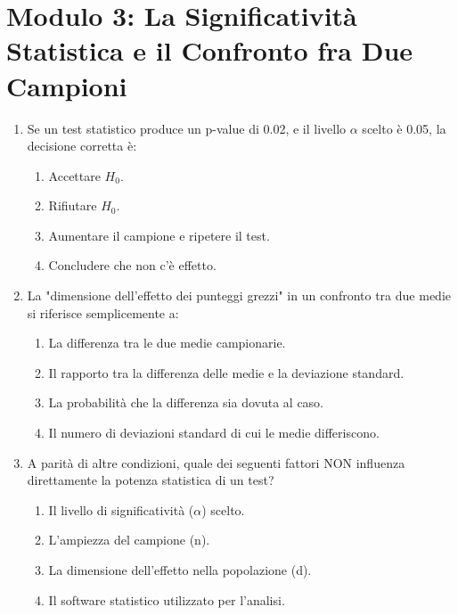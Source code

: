 \documentclass[12pt, a4paper]{article}
\begin{document}
\section*{Modulo 3: La Significatività Statistica e il Confronto fra Due Campioni}
\begin{enumerate}[resume]
    \item Se un test statistico produce un p-value di 0.02, e il livello $\alpha$ scelto è 0.05, la decisione corretta è:
    \begin{enumerate}
        \item Accettare $H_0$.
        \item Rifiutare $H_0$.
        \item Aumentare il campione e ripetere il test.
        \item Concludere che non c'è effetto.
    \end{enumerate}
    \vspace{0.3cm}

    \item La "dimensione dell'effetto dei punteggi grezzi" in un confronto tra due medie si riferisce semplicemente a:
    \begin{enumerate}
        \item La differenza tra le due medie campionarie.
        \item Il rapporto tra la differenza delle medie e la deviazione standard.
        \item La probabilità che la differenza sia dovuta al caso.
        \item Il numero di deviazioni standard di cui le medie differiscono.
    \end{enumerate}
    \vspace{0.3cm}

    \item A parità di altre condizioni, quale dei seguenti fattori NON influenza direttamente la potenza statistica di un test?
    \begin{enumerate}
        \item Il livello di significatività ($\alpha$) scelto.
        \item L'ampiezza del campione (n).
        \item La dimensione dell'effetto nella popolazione (d).
        \item Il software statistico utilizzato per l'analisi.
    \end{enumerate}
    \vspace{0.3cm}


\end{enumerate}
\end{document}
